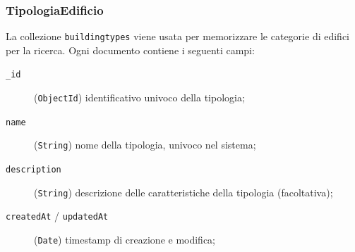     \subsubsection{TipologiaEdificio}
        La collezione \texttt{buildingtypes} viene usata per memorizzare le
        categorie di edifici per la ricerca. Ogni documento contiene i seguenti campi:
        \begin{description}
            \item[\texttt{\_id}] (\texttt{ObjectId}) identificativo univoco della tipologia;
            \item[\texttt{name}] (\texttt{String}) nome della tipologia, univoco nel sistema;
            \item[\texttt{description}] (\texttt{String}) descrizione delle caratteristiche della tipologia (facoltativa);
            \item[\texttt{createdAt} / \texttt{updatedAt}] (\texttt{Date}) timestamp di creazione e modifica;
        \end{description}
